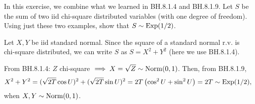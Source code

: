 \begin{exercise}
In this exercise, we combine what we learned in BH.8.1.4 and  BH.8.1.9.  Let $S$ be the sum of two iid chi-square distributed variables (with one degree of freedom). Using just these two examples, show that $S \sim \mathrm{Exp}(1/2)$.

\begin{hint}
Let $X, Y$ be iid standard normal. Since the square of a standard normal r.v. is chi-square distributed, we can write $S$ as $S=X^2+Y^2$ (here we use  BH.8.1.4).
\end{hint}
\begin{solution}
  From BH.8.1.4: $Z$ chi-square $\implies X=\sqrt{Z} \sim \mathrm{Norm}(0,1)$.
  Then, from BH.8.1.9,
\begin{equation}
X^{2}+Y^2 = (\sqrt{2T} \cos U)^2 + (\sqrt{2T} \sin U)^2 = 2T \left(\cos^2 U+\sin^2 U\right) = 2T \sim \mathrm{Exp}(1/2),
\end{equation}
 when $X, Y\sim \mathrm{Norm}(0,1)$.
\end{solution}
\end{exercise}




